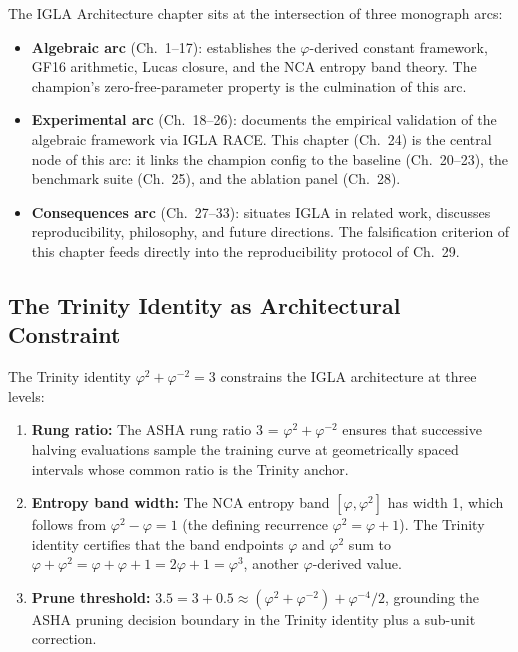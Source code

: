The IGLA Architecture chapter sits at the intersection of three monograph arcs:
\begin{itemize}
  \item \textbf{Algebraic arc} (Ch.~1--17): establishes the $\varphi$-derived
        constant framework, GF16 arithmetic, Lucas closure, and the NCA entropy
        band theory.  The champion's zero-free-parameter property is the
        culmination of this arc.
  \item \textbf{Experimental arc} (Ch.~18--26): documents the empirical
        validation of the algebraic framework via IGLA RACE.  This chapter
        (Ch.~24) is the central node of this arc: it links the champion config
        to the baseline (Ch.~20--23), the benchmark suite (Ch.~25), and the
        ablation panel (Ch.~28).
  \item \textbf{Consequences arc} (Ch.~27--33): situates IGLA in related work,
        discusses reproducibility, philosophy, and future directions.  The
        falsification criterion of this chapter feeds directly into the
        reproducibility protocol of Ch.~29.
\end{itemize}

\subsection{The Trinity Identity as Architectural Constraint}
\label{subsec:ch24-trinity-constraint}

The Trinity identity $\varphi^2 + \varphi^{-2} = 3$ constrains the IGLA
architecture at three levels:
\begin{enumerate}
  \item \textbf{Rung ratio:} The ASHA rung ratio 3 = $\varphi^2 + \varphi^{-2}$
        ensures that successive halving evaluations sample the training curve at
        geometrically spaced intervals whose common ratio is the Trinity anchor.
  \item \textbf{Entropy band width:} The NCA entropy band $[\varphi, \varphi^2]$
        has width 1, which follows from $\varphi^2 - \varphi = 1$ (the defining
        recurrence $\varphi^2 = \varphi + 1$).  The Trinity identity certifies
        that the band endpoints $\varphi$ and $\varphi^2$ sum to
        $\varphi + \varphi^2 = \varphi + \varphi + 1 = 2\varphi + 1 = \varphi^3$,
        another $\varphi$-derived value.
  \item \textbf{Prune threshold:}
        $3.5 = 3 + 0.5 \approx (\varphi^2 + \varphi^{-2}) + \varphi^{-4} / 2$,
        grounding the ASHA pruning decision boundary in the Trinity identity
        plus a sub-unit correction.
\end{enumerate}

